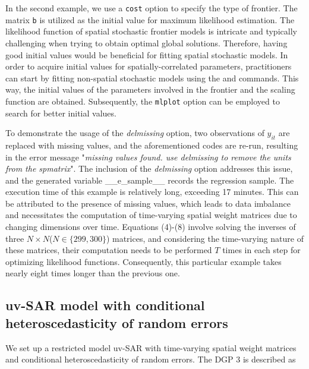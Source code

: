 \begin{stlog}
	
\end{stlog}

In the second example, we use a {\tt cost} option to specify the type of frontier. The matrix {\tt b} is utilized as the initial value for maximum likelihood estimation. The likelihood function of spatial stochastic frontier models is intricate and typically challenging when trying to obtain optimal global solutions. Therefore, having good initial values would be beneficial for fitting spatial stochastic models. In order to acquire initial values for spatially-correlated parameters, practitioners can start by fitting non-spatial stochastic models using the  and  commands. This way,  the initial values of the parameters involved in the frontier and the scaling function are obtained. Subsequently, the {\tt mlplot} option can be employed to search for better initial values.

To demonstrate the usage of the \textit{delmissing} option, two observations of $y_{it}$ are replaced with missing values, and the aforementioned codes are re-run, resulting in the error message "\textit{missing values found. use delmissing to remove the units from the spmatrix}". The inclusion of the \textit{delmissing} option addresses this issue, and the generated variable \_\_e\_sample\_\_ records the regression sample. The execution time of this example is relatively long, exceeding 17 minutes. This can be attributed to the presence of missing values, which leads to data imbalance and necessitates the computation of time-varying spatial weight matrices due to changing dimensions over time. Equations (4)-(8) involve solving the inverses of three $N \times N$($N \in \{299,300\}$) matrices, and considering the time-varying nature of these matrices, their computation needs to be performed $T$ times in each step for optimizing likelihood functions. Consequently, this particular example takes nearly eight times longer than the previous one.
 
 \begin{stlog}
 	
 	
 \end{stlog}
 
 \subsection{uv-SAR model with conditional heteroscedasticity of random errors }
 \vspace{5pt}
We set up a restricted model uv-SAR with time-varying spatial weight matrices and conditional heteroscedasticity of random errors. The DGP 3 is described as
 
